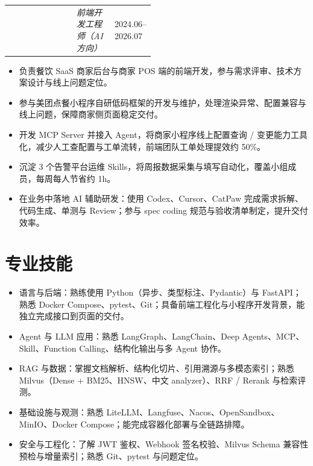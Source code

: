\documentclass{resume-photo}
\makeatletter
\renewcommand{\heiti}{\bfseries}
\newcommand{\ResumeItemRow}[3]{%
  \par\noindent
  \begin{tabularx}{\linewidth}{@{} >{\raggedright\arraybackslash}X >{\centering\arraybackslash}p{0.26\linewidth} >{\raggedleft\arraybackslash}p{0.22\linewidth} @{}}
    {\heiti #1} & {\textit{#2}} & {#3} \\
  \end{tabularx}
  \par\vspace{1pt}%
}
\makeatother
\begin{document}
\vspace{2pt}
\ResumeItemRow{美团｜营销 SaaS}{前端开发工程师（AI 方向）}{2024.06--2026.07}
\begin{itemize}
  \item 负责餐饮 SaaS 商家后台与商家 POS 端的前端开发，参与需求评审、技术方案设计与线上问题定位。
  \item 参与美团点餐小程序自研低码框架的开发与维护，处理渲染异常、配置兼容与线上问题，保障商家侧页面稳定交付。
  \item 开发 MCP Server 并接入 Agent，将商家小程序线上配置查询 / 变更能力工具化，减少人工查配置与工单流转，前端团队工单处理提效约 50\%。
  \item 沉淀 3 个告警平台运维 Skills，将周报数据采集与填写自动化，覆盖小组成员，每周每人节省约 1h。
  \item 在业务中落地 AI 辅助研发：使用 Codex、Cursor、CatPaw 完成需求拆解、代码生成、单测与 Review；参与 spec coding 规范与验收清单制定，提升交付效率。
\end{itemize}

\section{专业技能}
\begin{itemize}
  \item 语言与后端：熟练使用 Python（异步、类型标注、Pydantic）与 FastAPI；熟悉 Docker Compose、pytest、Git；具备前端工程化与小程序开发背景，能独立完成接口到页面的交付。
  \item Agent 与 LLM 应用：熟悉 LangGraph、LangChain、Deep Agents、MCP、Skill、Function Calling、结构化输出与多 Agent 协作。
  \item RAG 与数据：掌握文档解析、结构化切片、引用溯源与多模态索引；熟悉 Milvus（Dense + BM25、HNSW、中文 analyzer）、RRF / Rerank 与检索评测。
  \item 基础设施与观测：熟悉 LiteLLM、Langfuse、Nacos、OpenSandbox、MinIO、Docker Compose；能完成容器化部署与全链路排障。
  \item 安全与工程化：了解 JWT 鉴权、Webhook 签名校验、Milvus Schema 兼容性预检与增量索引；熟悉 Git、pytest 与问题定位。
\end{itemize}
\end{document}
